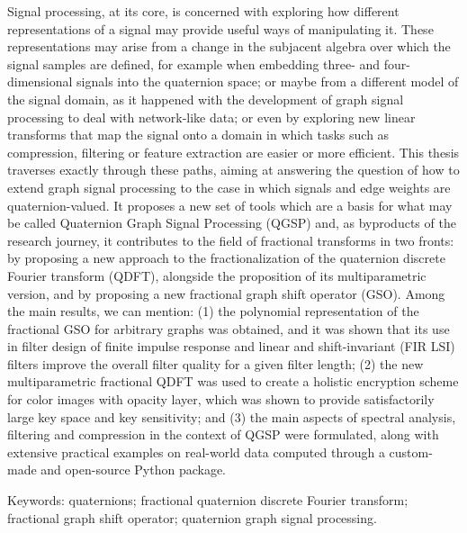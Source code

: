 
%

Signal processing, at its core, is concerned with exploring how different representations of a signal may provide useful ways of manipulating it. These representations may arise from a change in the subjacent algebra over which the signal samples are defined, for example when embedding three- and four-dimensional signals into the quaternion space; or maybe from a different model of the signal domain, as it happened with the development of graph signal processing to deal with network-like data; or even by exploring new linear transforms that map the signal onto a domain in which tasks such as compression, filtering or feature extraction are easier or more efficient.
This thesis traverses exactly through these paths, aiming at answering the question of how to extend graph signal processing to the case in which signals and edge weights are quaternion-valued. It proposes a new set of tools which are a basis for what may be called Quaternion Graph Signal Processing (QGSP) and, as byproducts of the research journey, it contributes to the field of fractional transforms in two fronts: by proposing a new approach to the fractionalization of the quaternion discrete Fourier transform (QDFT), alongside the proposition of its multiparametric version, and by proposing a new fractional graph shift operator (GSO).
Among the main results, we can mention: (1) the polynomial representation of the fractional GSO for arbitrary graphs was obtained, and it was shown that its use in filter design of finite impulse response and linear and shift-invariant (FIR LSI) filters improve the overall filter quality for a given filter length; (2) the new multiparametric fractional QDFT was used to create a holistic encryption scheme for color images with opacity layer, which was shown to provide satisfactorily large key space and key sensitivity; and (3) the main aspects of spectral analysis, filtering and compression in the context of QGSP were formulated, along with extensive practical examples on real-world data computed through a custom-made and open-source Python package.
\vspace{1em}

Keywords: quaternions; fractional quaternion discrete Fourier transform; fractional graph shift operator; quaternion graph signal processing.

